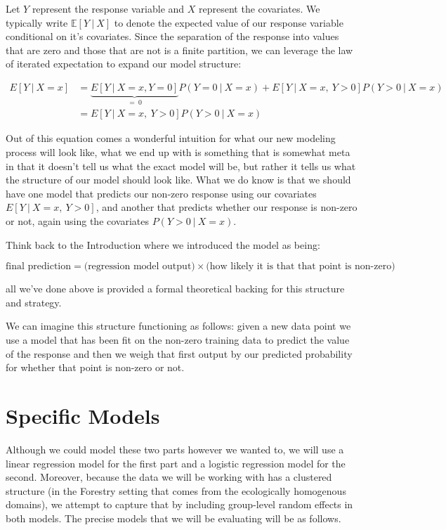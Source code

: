 \documentclass[12pt,twoside]{reedthesis}
\begin{document}
Let \(Y\) represent the response variable and \(X\) represent the covariates. We typically write \(\mathbb{E}[Y \ | \ X]\) to denote the expected value of our response variable conditional on it's covariates. Since the separation of the response into values that are zero and those that are not is a finite partition, we can leverage the law of iterated expectation to expand our model structure:

\[
\begin{aligned}
    E[ Y  \ | \ X = x] &= \underbrace{E[Y \ | \ X = x, Y = 0]}_{= \ 0}P(Y = 0 \ | \ X = x) + E[Y \ | \ X = x, \ Y > 0]P(Y> 0 \ | \ X = x) \\
    &= E[Y \ | \ X = x, \ Y > 0]P(Y > 0 \ | \ X = x) 
\end{aligned}
\]

Out of this equation comes a wonderful intuition for what our new modeling process will look like, what we end up with is something that is somewhat meta in that it doesn't tell us what the exact model will be, but rather it tells us what the structure of our model should look like. What we do know is that we should have one model that predicts our non-zero response using our covariates \(E[Y \ | \ X = x, \ Y>0]\), and another that predicts whether our response is non-zero or not, again using the covariates \(P(Y > 0 \ | \ X = x)\).

Think back to the Introduction where we introduced the model as being:

\[
\text{final prediction} = \bigg(\text{regression model output}\bigg) \times \bigg(\text{how likely it is that that point is non-zero}\bigg)
\]

all we've done above is provided a formal theoretical backing for this structure and strategy.

We can imagine this structure functioning as follows: given a new data point we use a model that has been fit on the non-zero training data to predict the value of the response and then we weigh that first output by our predicted probability for whether that point is non-zero or not.

\hypertarget{specific-models}{%
\section{Specific Models}\label{specific-models}}

Although we could model these two parts however we wanted to, we will use a linear regression model for the first part and a logistic regression model for the second. Moreover, because the data we will be working with has a clustered structure (in the Forestry setting that comes from the ecologically homogenous domains), we attempt to capture that by including group-level random effects in both models. The precise models that we will be evaluating will be as follows.
\end{document}
